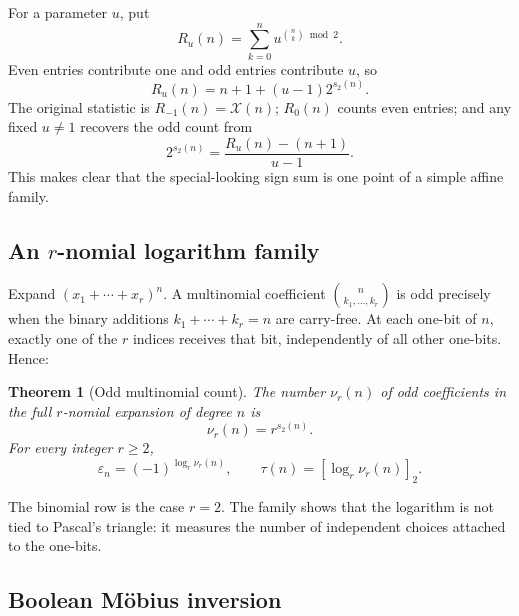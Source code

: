 \documentclass[11pt,oneside]{article}
\newtheorem{theorem}{Theorem}[section]
\theoremstyle{definition}
\theoremstyle{remark}
\newcommand{\wt}{s_2}
\newcommand{\eps}{\varepsilon}
\newcommand{\res}[2]{\left[#1\right]_{#2}}
\begin{document}
For a parameter \(u\), put
\begin{equation}
  R_u(n)=\sum_{k=0}^{n}u^{\binom nk\bmod2}.                 \label{eq:Ru-def}
\end{equation}
Even entries contribute one and odd entries contribute \(u\), so
\begin{equation}
  \boxed{R_u(n)=n+1+(u-1)2^{\wt(n)}.}                       \label{eq:Ru-exact}
\end{equation}
The original statistic is \(R_{-1}(n)=\mathcal X(n)\); \(R_0(n)\) counts even entries; and
any fixed \(u\ne1\) recovers the odd count from
\begin{equation}
  2^{\wt(n)}=\frac{R_u(n)-(n+1)}{u-1}.                      \label{eq:Ru-recovery}
\end{equation}
This makes clear that the special-looking sign sum is one point of a simple affine family.

\subsection{An \texorpdfstring{\(r\)}{r}-nomial logarithm family}

Expand \((x_1+\cdots+x_r)^n\).  A multinomial coefficient
\(\binom{n}{k_1,\ldots,k_r}\) is odd precisely when the binary additions
\(k_1+\cdots+k_r=n\) are carry-free.  At each one-bit of \(n\), exactly one of the \(r\)
indices receives that bit, independently of all other one-bits.  Hence:

\begin{theorem}[Odd multinomial count]
\label{thm:odd-multinomial}
The number \(\nu_r(n)\) of odd coefficients in the full \(r\)-nomial expansion of degree
\(n\) is
\begin{equation}
  \boxed{\nu_r(n)=r^{\wt(n)}.}                              \label{eq:odd-multinomial-count}
\end{equation}
For every integer \(r\ge2\),
\begin{equation}
  \eps_n=(-1)^{\log_r\nu_r(n)},
  \qquad
  \tau(n)=\res{\log_r\nu_r(n)}2.                           \label{eq:rnomial-log}
\end{equation}
\end{theorem}

The binomial row is the case \(r=2\).  The family shows that the logarithm is not tied to
Pascal's triangle: it measures the number of independent choices attached to the one-bits.

\subsection{Boolean M\"obius inversion}
\end{document}
